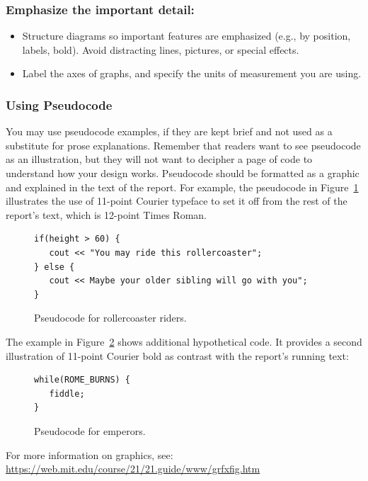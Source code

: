 \documentclass[strict]{6033dp1}
\begin{document}
\subsubsection{Emphasize the important detail:}
\begin{itemize}
\item Structure diagrams so important features are emphasized (e.g.,
  by position, labels, bold).  Avoid distracting lines, pictures, or
  special effects.
\item Label the axes of graphs, and specify the units of measurement
  you are using.
\end{itemize}

\subsubsection{Using Pseudocode}
You may use pseudocode examples, if they are kept brief and not used
as a substitute for prose explanations.  Remember that readers want to
see pseudocode as an illustration, but they will not want to decipher
a page of code to understand how your design works.  Pseudocode should
be formatted as a graphic and explained in the text of the report.
For example, the pseudocode in Figure~\ref{rollercoaster} illustrates
the use of 11-point Courier typeface to set it off from the rest of
the report's text, which is 12-point Times Roman.

\begin{figure}[!h]
\begin{lstlisting}
if(height > 60) {
   cout << "You may ride this rollercoaster";
} else {
   cout << Maybe your older sibling will go with you";
}
\end{lstlisting}
  \caption{Pseudocode for rollercoaster riders.}
  \label{rollercoaster}
\end{figure}

The example in Figure~\ref{emperors} shows additional hypothetical
code.  It provides a second illustration of 11-point Courier bold as
contrast with the report's running text:

\begin{figure}[!h]
  \begin{lstlisting}
while(ROME_BURNS) {
   fiddle;
}
  \end{lstlisting}
  \caption{Pseudocode for emperors.}
  \label{emperors}
\end{figure}

For more information on graphics, see:\\
\url{https://web.mit.edu/course/21/21.guide/www/grfxfig.htm}
\end{document}
